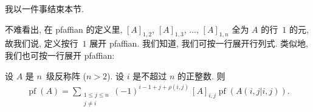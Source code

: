 \documentclass[../libro.tex]{subfiles}
\begin{document}
我以一件事结束本节.

不难看出, 在 pfaffian 的定义里,
\([A]_{1,2}\), \([A]_{1,3}\), \(\dots\), \([A]_{1,n}\)
全为 \(A\) 的行~\(1\) 的元,
故我们说, 定义按行~\(1\) 展开 pfaffian.
我们知道, 我们可按一行展开行列式.
类似地, 我们也可按一行展开 pfaffian:

\begin{theorem}
    设 \(A\) 是 \(n\)~级反称阵 (\(n > 2\)).
    设 \(i\) 是不超过 \(n\) 的正整数.
    则
    \begin{align*}
        \operatorname{pf} {(A)}
        =
        \sum_{\substack{1 \leq j \leq n \\ j \neq i}}
        {
            (-1)^{i-1+j+\rho(i,j)}\, [A]_{i,j}
        \operatorname{pf} {(A({i,j}|{i,j}))}}.
    \end{align*}
\end{theorem}
\end{document}
